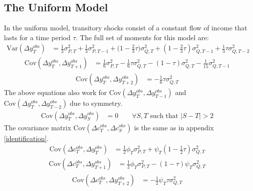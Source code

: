 \subsection{The Uniform Model}
In the uniform model, transitory shocks consist of a constant flow of income that lasts for a time period $\tau$. The full set of moments for this model are:
\begin{align}
\mathrm{Var}(\Delta y^{obs}_T) &= \frac{1}{3}\sigma^2_{P,T} + \frac{1}{3}\sigma^2_{P,T-1} + \big(1-\frac{2}{3}\tau\big) \sigma^2_{Q,T}   +(1-\frac{2}{3}\tau) \sigma^2_{Q,T-1} + \frac{1}{3} \tau\sigma^2_{Q,T-2}
\end{align}
\begin{align}
\mathrm{Cov}(\Delta y^{obs}_T, \Delta y^{obs}_{T+1}) &= \frac{1}{6}\sigma^2_{P,T}  -\frac{1}{6}\tau \sigma^2_{Q,T}  -(1-\tau) \sigma^2_{Q,T}  -\frac{1}{15} \sigma^2_{Q,T-1}
\end{align}
\begin{align}
\mathrm{Cov}(\Delta y^{obs}_T, \Delta y^{obs}_{T+2})&= -\frac{1}{6}\tau \sigma^2_{Q,T}
\end{align}
The above equations also work for $\mathrm{Cov}(\Delta y^{obs}_T, \Delta y^{obs}_{T-1})$ and $\mathrm{Cov}(\Delta y^{obs}_T, \Delta y^{obs}_{T-2})$ due to symmetry.
\begin{align}
\mathrm{Cov}(\Delta y^{obs}_T, \Delta y^{obs}_{S}) &= 0 \qquad \forall S,T \text{ such that }|S-T| >2 
\end{align}
The covariance matrix $\mathrm{Cov}(\Delta c^{obs}_T, \Delta c^{obs}_{S})$ is the same as in appendix \ref{identification}.
\begin{align}
\mathrm{Cov}(\Delta c^{obs}_T, \Delta y^{obs}_T) &= \frac{1}{2} \phi_T \sigma^2_{P,T} + \psi_T  (1-\frac{1}{2}\tau )\sigma^2_{Q,T} 
\end{align}
\begin{align}
\mathrm{Cov}(\Delta c^{obs}_T, \Delta y^{obs}_{T+1})&= \frac{1}{2} \phi_T \sigma^2_{P,T} - (1-\tau) \psi_T \sigma^2_{Q,T} 
\end{align}
\begin{align}
\mathrm{Cov}(\Delta c^{obs}_T, \Delta y^{obs}_{T+2}) &= -\frac{1}{2}\psi_T  \tau \sigma^2_{Q,T}
\end{align}

